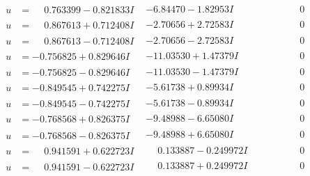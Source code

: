 \documentclass[1p]{elsarticle_modified}
\theoremstyle{definition}
\begin{document}
$$\begin{array}{c|c|c}
\begin{aligned}
u &= \phantom{-}0.763399 - 0.821833 I\end{aligned}
 & -6.84470 - 1.82953 I & \phantom{-0.000000 } 0 \\ \hline\begin{aligned}
u &= \phantom{-}0.867613 + 0.712408 I\end{aligned}
 & -2.70656 + 2.72583 I & \phantom{-0.000000 } 0 \\ \hline\begin{aligned}
u &= \phantom{-}0.867613 - 0.712408 I\end{aligned}
 & -2.70656 - 2.72583 I & \phantom{-0.000000 } 0 \\ \hline\begin{aligned}
u &= -0.756825 + 0.829646 I\end{aligned}
 & -11.03530 + 1.47379 I & \phantom{-0.000000 } 0 \\ \hline\begin{aligned}
u &= -0.756825 - 0.829646 I\end{aligned}
 & -11.03530 - 1.47379 I & \phantom{-0.000000 } 0 \\ \hline\begin{aligned}
u &= -0.849545 + 0.742275 I\end{aligned}
 & -5.61738 + 0.89934 I & \phantom{-0.000000 } 0 \\ \hline\begin{aligned}
u &= -0.849545 - 0.742275 I\end{aligned}
 & -5.61738 - 0.89934 I & \phantom{-0.000000 } 0 \\ \hline\begin{aligned}
u &= -0.768568 + 0.826375 I\end{aligned}
 & -9.48988 - 6.65080 I & \phantom{-0.000000 } 0 \\ \hline\begin{aligned}
u &= -0.768568 - 0.826375 I\end{aligned}
 & -9.48988 + 6.65080 I & \phantom{-0.000000 } 0 \\ \hline\begin{aligned}
u &= \phantom{-}0.941591 + 0.622723 I\end{aligned}
 & \phantom{-}0.133887 - 0.249972 I & \phantom{-0.000000 } 0 \\ \hline\begin{aligned}
u &= \phantom{-}0.941591 - 0.622723 I\end{aligned}
 & \phantom{-}0.133887 + 0.249972 I & \phantom{-0.000000 } 0 \\ \hline\begin{aligned}

\end{aligned}
\end{array}$$
\end{document}
